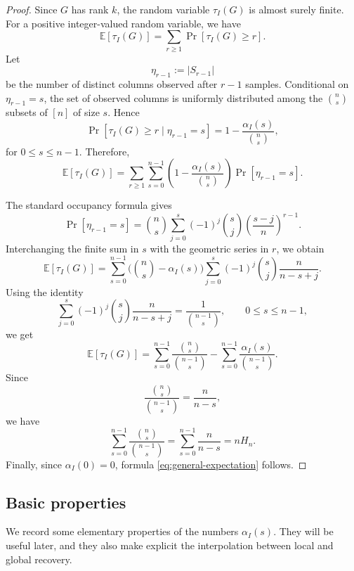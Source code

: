 \documentclass[11pt,a4paper]{article}
\numberwithin{equation}{section}
\theoremstyle{definition}
\theoremstyle{definition}
\newcommand{\E}{\mathbb{E}}
\begin{document}
\begin{proof}
Since $G$ has rank $k$, the random variable $\tau_I(G)$ is almost surely finite. For a positive integer-valued random variable, we have
\[
\E[\tau_I(G)]
=
\sum_{r\geq 1}\Pr[\tau_I(G)\geq r].
\]
Let
\[
\eta_{r-1}:=|S_{r-1}|
\]
be the number of distinct columns observed after $r-1$ samples. Conditional on $\eta_{r-1}=s$, the set of observed columns is uniformly distributed among the $\binom ns$ subsets of $[n]$ of size $s$. Hence
\[
\Pr[\tau_I(G)\geq r\mid \eta_{r-1}=s]
=
1-\frac{\alpha_I(s)}{\binom ns},
\]
for $0\leq s\leq n-1$. Therefore,
\[
\E[\tau_I(G)]
=
\sum_{r\geq 1}
\sum_{s=0}^{n-1}
\left(1-\frac{\alpha_I(s)}{\binom ns}\right)
\Pr[\eta_{r-1}=s].
\]

The standard occupancy formula gives
\[
\Pr[\eta_{r-1}=s]
=
\binom ns
\sum_{j=0}^s
(-1)^j
\binom sj
\left(\frac{s-j}{n}\right)^{r-1}.
\]
Interchanging the finite sum in $s$ with the geometric series in $r$, we obtain
\[
\E[\tau_I(G)]
=
\sum_{s=0}^{n-1}
\bigl(\binom ns-\alpha_I(s)\bigr)
\sum_{j=0}^s
(-1)^j
\binom sj
\frac{n}{n-s+j}.
\]
Using the identity
\[
\sum_{j=0}^s
(-1)^j
\binom sj
\frac{n}{n-s+j}
=
\frac{1}{\binom{n-1}{s}},
\qquad 0\leq s\leq n-1,
\]
we get
\[
\E[\tau_I(G)]
=
\sum_{s=0}^{n-1}
\frac{\binom ns}{\binom{n-1}{s}}
-
\sum_{s=0}^{n-1}
\frac{\alpha_I(s)}{\binom{n-1}{s}}.
\]
Since
\[
\frac{\binom ns}{\binom{n-1}{s}}=\frac{n}{n-s},
\]
we have
\[
\sum_{s=0}^{n-1}
\frac{\binom ns}{\binom{n-1}{s}}
=
\sum_{s=0}^{n-1}\frac{n}{n-s}
=
nH_n.
\]
Finally, since $\alpha_I(0)=0$, formula \eqref{eq:general-expectation} follows.
\end{proof}

\subsection{Basic properties}\label{subsec:basic-properties}

We record some elementary properties of the numbers $\alpha_I(s)$.  They
will be useful later, and they also make explicit the interpolation between
local and global recovery.
\end{document}
